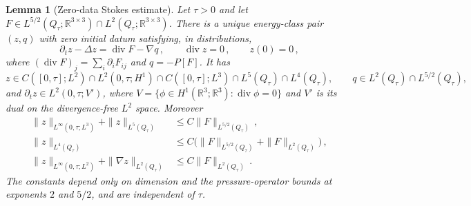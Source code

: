 \documentclass[11pt,letterpaper]{article}
\numberwithin{equation}{section}
\theoremstyle{plain}
\newtheorem{lemma}[theorem]{Lemma}
\theoremstyle{definition}
\theoremstyle{remark}
\begin{document}
\begin{lemma}[Zero-data Stokes estimate]\label{lem:pv-stokes}
Let $\tau>0$ and let $F\in L^{5/2}(Q_\tau;\mathbb R^{3\times3})\cap L^2(Q_\tau;\mathbb R^{3\times3})$. There is a unique energy-class pair $(z,q)$ with zero initial datum satisfying, in distributions,
\begin{equation*}
\partial_tz-\Delta z=\operatorname{div}F-\nabla q\,,\qquad \operatorname{div}z=0\,,\qquad z(0)=0\,,
\end{equation*}
where $(\operatorname{div}F)_j=\sum_i\partial_iF_{ij}$ and $q=-P[F]$. It has
\begin{equation*}
z\in C([0,\tau];L^2)\cap L^2(0,\tau;H^1)\cap C([0,\tau];L^3)\cap L^5(Q_\tau)\cap L^4(Q_\tau),\qquad q\in L^2(Q_\tau)\cap L^{5/2}(Q_\tau),
\end{equation*}
and $\partial_tz\in L^2(0,\tau;V')$, where $V=\{\phi\in H^1(\mathbb R^3;\mathbb R^3):\operatorname{div}\phi=0\}$ and $V'$ is its dual on the divergence-free $L^2$ space. Moreover
\begin{align}
 \|z\|_{L^\infty(0,\tau;L^3)}+\|z\|_{L^5(Q_\tau)}&\le C\|F\|_{L^{5/2}(Q_\tau)}\,,\label{eq:pv-stokes-l5}\\
 \|z\|_{L^4(Q_\tau)}&\le C\bigl(\|F\|_{L^{5/2}(Q_\tau)}+\|F\|_{L^2(Q_\tau)}\bigr)\,,\label{eq:pv-stokes-l4}\\
 \|z\|_{L^\infty(0,\tau;L^2)}+\|\nabla z\|_{L^2(Q_\tau)}&\le C\|F\|_{L^2(Q_\tau)}\,.\label{eq:pv-stokes-energy}
\end{align}
The constants depend only on dimension and the pressure-operator bounds at exponents $2$ and $5/2$, and are independent of $\tau$.
\end{lemma}
\end{document}
